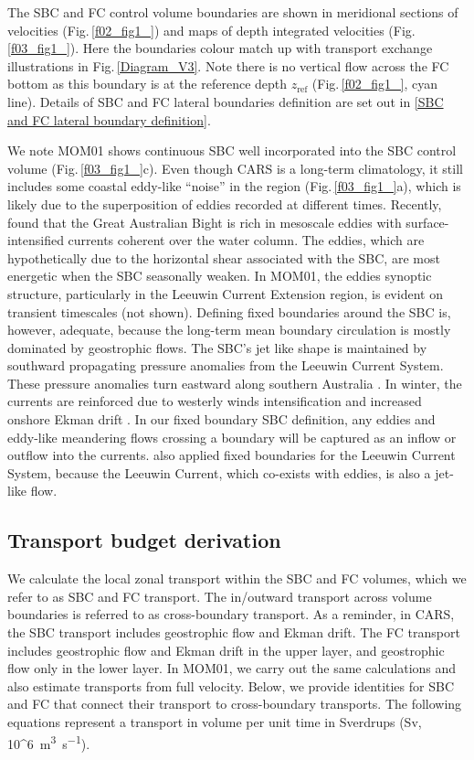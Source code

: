 \documentclass[preprint,3p,review,12pt]{elsarticle}
\newcommand{\sub}[1]{_{\text{#1}}}
\begin{document}
The SBC and FC control volume boundaries are shown in meridional sections of velocities (Fig.\,\ref{f02_fig1_}) and maps of depth integrated velocities (Fig.\,\ref{f03_fig1_}). Here the boundaries colour match up with transport exchange illustrations in Fig.\,\ref{Diagram_V3}. Note there is no vertical flow across the FC bottom as this boundary is at the reference depth $z\sub{ref}$ (Fig.\,\ref{f02_fig1_}, cyan line). Details of SBC and FC lateral boundaries definition are set out in \ref{SBC and FC lateral boundary definition}.

We note MOM01 shows continuous SBC well incorporated into the SBC control volume (Fig.\,\ref{f03_fig1_}c). Even though CARS is a long-term climatology, it still includes some coastal eddy-like ``noise'' in the region (Fig.\,\ref{f03_fig1_}a), which is likely due to the superposition of eddies recorded at different times. Recently, \citet{Oke2018} found that the Great Australian Bight is rich in mesoscale eddies with surface-intensified currents coherent over the water column. The eddies, which are hypothetically due to the horizontal shear associated with the SBC, are most energetic when the SBC seasonally weaken. In MOM01, the eddies synoptic structure, particularly in the Leeuwin Current Extension region, is evident on transient timescales (not shown). Defining fixed boundaries around the SBC is, however, adequate, because the long-term mean boundary circulation is mostly dominated by geostrophic flows. The SBC's jet like shape is maintained by southward propagating pressure anomalies from the Leeuwin Current System. These pressure anomalies turn eastward along southern Australia \citep{Middleton2007, Ridgway2015}. In winter, the currents are reinforced due to westerly winds intensification and increased onshore Ekman drift \citep{Ridgway2004}. In our fixed boundary SBC definition, any eddies and eddy-like meandering flows crossing a boundary will be captured as an inflow or outflow into the currents. \citet{Furue2017} also applied fixed boundaries for the Leeuwin Current System, because the Leeuwin Current, which co-exists with eddies, is also a jet-like flow.

\subsection{Transport budget derivation} \label{Transport budget derivation}
We calculate the local zonal transport within the SBC and FC volumes,
which we refer to as SBC and FC transport. The in/outward transport across volume boundaries is referred to as cross-boundary transport. As a reminder, in CARS, the SBC transport includes geostrophic flow and Ekman drift. The FC transport includes geostrophic flow and Ekman drift in the upper layer, and geostrophic flow only in the lower layer. In MOM01, we carry out the same calculations and also estimate transports from full velocity.
Below, we provide identities for SBC and FC that connect their transport to cross-boundary transports. The following equations represent a transport in volume per unit time in Sverdrups (\si{Sv},  \SI[parse-numbers=false]{10^6}{\cubic\meter\per\second}).
\end{document}
